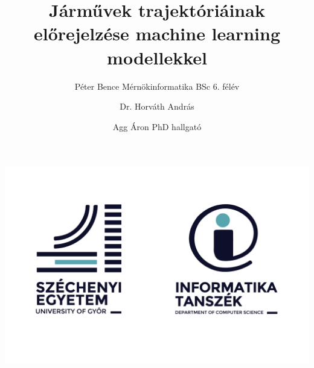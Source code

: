 \documentclass[acmtog, authorversion]{acmart}
\begin{document}
\title{Járművek trajektóriáinak előrejelzése machine learning modellekkel}

\author{Péter Bence Mérnökinformatika BSc 6. félév}%
\authornotemark[1]

\author{Dr. Horváth András}

\author{Agg Áron PhD hallgató}

\begin{teaserfigure}
\includegraphics[width=1\columnwidth]{sze_givk_logo.png}
\end{teaserfigure}
\end{document}
